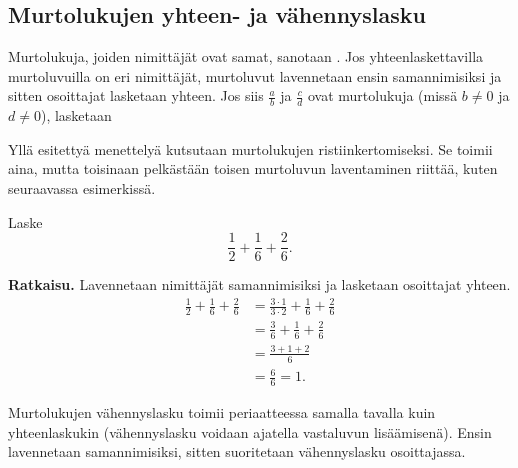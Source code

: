 \subsection*{Murtolukujen yhteen- ja vähennyslasku}


Murtolukuja, joiden nimittäjät ovat samat, sanotaan .
    Jos yhteenlaskettavilla murtoluvuilla on eri nimittäjät, murtoluvut lavennetaan ensin 
    samannimisiksi ja sitten osoittajat lasketaan yhteen. 
    Jos siis $\frac{a}{b}$ ja $\frac{c}{d}$ ovat murtolukuja (missä $b \neq 0$ ja $d \neq 0$), lasketaan

 
 Yllä esitettyä menettelyä kutsutaan murtolukujen ristiinkertomiseksi. Se toimii aina, mutta toisinaan 
 pelkästään toisen murtoluvun laventaminen riittää, kuten seuraavassa esimerkissä. 

\begin{esimerkki}
        Laske
        \[
        \frac{1}{2} + \frac{1}{6} + \frac{2}{6}.
        \]
        
        \textbf{Ratkaisu.}
        Lavennetaan nimittäjät samannimisiksi ja lasketaan osoittajat yhteen.
        \begin{align*}
            \frac{1}{2} + \frac{1}{6} + \frac{2}{6} &=\frac{3\cdot 1}{3\cdot 2} + \frac{1}{6} + \frac{2}{6}\\
            										&=\frac{3}{6} + \frac{1}{6} + \frac{2}{6}\\
           											&= \frac{3+1+2}{6}\\
           											&= \frac{6}{6} = 1.
        \end{align*}
    \end{esimerkki}
    
Murtolukujen vähennyslasku toimii periaatteessa samalla tavalla kuin yhteenlaskukin (vähennyslasku voidaan
ajatella vastaluvun lisäämisenä). Ensin lavennetaan samannimisiksi, sitten suoritetaan vähennyslasku 
osoittajassa.

